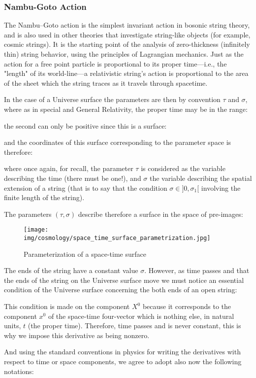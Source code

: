 	
	\subsubsection{Nambu-Goto Action}
	The Nambu–Goto action is the simplest invariant action in bosonic string theory, and is also used in other theories that investigate string-like objects (for example, cosmic strings). It is the starting point of the analysis of zero-thickness (infinitely thin) string behavior, using the principles of Lagrangian mechanics. Just as the action for a free point particle is proportional to its proper time—i.e., the "length" of its world-line—a relativistic string's action is proportional to the area of the sheet which the string traces as it travels through spacetime.
	
	In the case of a Universe surface the parameters are then by convention $\tau$ and $\sigma$, where as in special and General Relativity, the proper time may be in the range:
	
	the second can only be positive since this is a surface:
	
	and the coordinates of this surface corresponding to the parameter space is therefore:
	
	where once again, for recall, the parameter $\tau$ is considered as the variable describing the time (there must be one!), and $\sigma$ the variable describing the spatial extension of a string (that is to say that the condition $\sigma\in]0,\sigma_1[$ involving the finite length of the string).

	The parameters $(\tau,\sigma)$ describe therefore a surface in the space of pre-images:
	\begin{figure}[H]
		\begin{center}
		\texttt{[image: img/cosmology/space\_time\_surface\_parametrization.jpg]}
		\end{center}	
		\caption{Parameterization of a space-time surface}
	\end{figure}
	The ends of the string have a constant value $\sigma$. However, as time passes and that the ends of the string on the Universe surface move we must notice an essential condition of the Universe surface concerning the both ends of an open string:
	
	\begin{tcolorbox}[title=Remark,colframe=black,arc=10pt]
	This condition is made on the component $X^0$ because it corresponds to the component $x^0$ of the space-time four-vector which is nothing else, in natural units, $t$ (the proper time). Therefore, time passes and is never constant, this is why we  impose this derivative as being nonzero.
	\end{tcolorbox}
	And using the standard conventions in physics for writing the derivatives with respect to time or space components, we agree to adopt also now the following notations:
	

